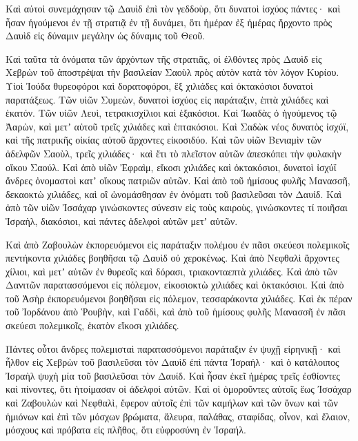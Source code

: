 {Καὶ αὐτοὶ συνεμάχησαν τῷ Δαυὶδ ἐπὶ τὸν γεδδοὺρ, ὅτι δυνατοὶ ἰσχύος πάντες· καὶ ἦσαν ἡγούμενοι ἐν τῇ στρατιᾷ ἐν τῇ δυνάμει,
ὅτι ἡμέραν ἐξ ἡμέρας ἤρχοντο πρὸς Δαυὶδ εἰς δύναμιν μεγάλην ὡς δύναμις τοῦ Θεοῦ.
\par }{\PP {}Καὶ ταῦτα τὰ ὀνόματα τῶν ἀρχόντων τῆς στρατιᾶς, οἱ ἐλθόντες πρὸς Δαυὶδ εἰς Χεβρὼν τοῦ ἀποστρέψαι τὴν βασιλείαν Σαοὺλ πρὸς αὐτὸν κατὰ τὸν λόγον Κυρίου.
Υἱοὶ Ἰούδα θυρεοφόροι καὶ δορατοφόροι, ἓξ χιλιάδες καὶ ὀκτακόσιοι δυνατοὶ παρατάξεως.
Τῶν υἱῶν Συμεὼν, δυνατοὶ ἰσχύος εἰς παράταξιν, ἑπτὰ χιλιάδες καὶ ἑκατόν.
Τῶν υἱῶν Λευὶ, τετρακισχίλιοι καὶ ἑξακόσιοι.
Καὶ Ἰωαδὰς ὁ ἡγούμενος τῷ Ἀαρὼν, καὶ μετʼ αὐτοῦ τρεῖς χιλιάδες καὶ ἑπτακόσιοι.
Καὶ Σαδὼκ νέος δυνατὸς ἰσχύϊ, καὶ τῆς πατρικῆς οἰκίας αὐτοῦ ἄρχοντες εἰκοσιδύο.
Καὶ τῶν υἱῶν Βενιαμὶν τῶν ἀδελφῶν Σαοὺλ, τρεῖς χιλιάδες· καὶ ἔτι τὸ πλεῖστον αὐτῶν ἀπεσκόπει τὴν φυλακὴν οἴκου Σαούλ.
Καὶ ἀπὸ υἱῶν Ἐφραὶμ, εἴκοσι χιλιάδες καὶ ὀκτακόσιοι, δυνατοὶ ἰσχύϊ ἄνδρες ὀνομαστοὶ κατʼ οἴκους πατριῶν αὐτῶν.
Καὶ ἀπὸ τοῦ ἡμίσους φυλῆς Μανασσῆ, δεκαοκτὼ χιλιάδες, καὶ οἳ ὠνομάσθησαν ἐν ὀνόματι τοῦ βασιλεῦσαι τὸν Δαυίδ.
Καὶ ἀπὸ τῶν υἱῶν Ἰσσάχαρ γινώσκοντες σύνεσιν εἰς τοὺς καιροὺς, γινώσκοντες τί ποιῆσαι Ἰσραὴλ, διακόσιοι, καὶ πάντες ἀδελφοὶ αὐτῶν μετʼ αὐτῶν.
\par }{\PP {}Καὶ ἀπὸ Ζαβουλὼν ἐκπορευόμενοι εἰς παράταξιν πολέμου ἐν πᾶσι σκεύεσι πολεμικοῖς πεντήκοντα χιλιάδες βοηθῆσαι τῷ Δαυὶδ οὐ χεροκένως.
Καὶ ἀπὸ Νεφθαλὶ ἄρχοντες χίλιοι, καὶ μετʼ αὐτῶν ἐν θυρεοῖς καὶ δόρασι, τριακονταεπτὰ χιλιάδες.
Καὶ ἀπὸ τῶν Δανιτῶν παρατασσόμενοι εἰς πόλεμον, εἰκοσιοκτὼ χιλιάδες καὶ ὀκτακόσιοι.
Καὶ ἀπὸ τοῦ Ἀσὴρ ἐκπορευόμενοι βοηθῆσαι εἰς πόλεμον, τεσσαράκοντα χιλιάδες.
Καὶ ἐκ πέραν τοῦ Ἰορδάνου ἀπὸ Ῥουβὴν, καὶ Γαδδὶ, καὶ ἀπὸ τοῦ ἡμίσους φυλῆς Μανασσῆ ἐν πᾶσι σκεύεσι πολεμικοῖς, ἑκατὸν εἴκοσι χιλιάδες.
\par }{\PP {}Πάντες οὗτοι ἄνδρες πολεμισταὶ παρατασσόμενοι παράταξιν ἐν ψυχῇ εἰρηνικῇ· καὶ ἦλθον εἰς Χεβρὼν τοῦ βασιλεῦσαι τὸν Δαυὶδ ἐπὶ πάντα Ἰσραήλ· καὶ ὁ κατάλοιπος Ἰσραὴλ ψυχὴ μία τοῦ βασιλεῦσαι τὸν Δαυίδ.
Καὶ ἦσαν ἐκεῖ ἡμέρας τρεῖς ἐσθίοντες καὶ πίνοντες, ὅτι ἡτοίμασαν οἱ ἀδελφοὶ αὐτῶν.
Καὶ οἱ ὁμοροῦντες αὐτοῖς ἕως Ἰσσάχαρ καὶ Ζαβουλὼν καὶ Νεφθαλὶ, ἔφερον αὐτοῖς ἐπὶ τῶν καμήλων καὶ τῶν ὄνων καὶ τῶν ἡμιόνων καὶ ἐπὶ τῶν μόσχων βρώματα, ἄλευρα, παλάθας, σταφίδας, οἶνον, καὶ ἔλαιον, μόσχους καὶ πρόβατα εἰς πλῆθος, ὅτι εὐφροσύνη ἐν Ἰσραήλ.

}
